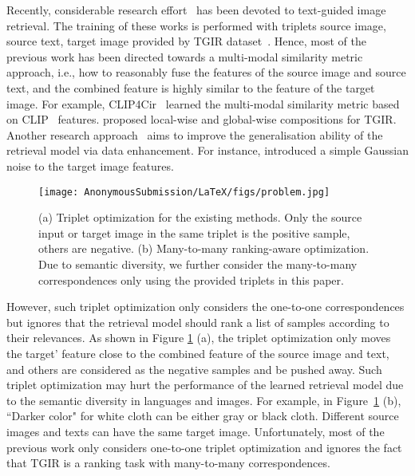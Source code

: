 \documentclass[letterpaper]{article} \usepackage{aaai24}  \usepackage{times}  \usepackage{helvet}  \usepackage{courier}  \usepackage[hyphens]{url}  \usepackage{graphicx} \urlstyle{rm} \def\UrlFont{\rm}  \usepackage{natbib}  \usepackage{caption} \frenchspacing  \setlength{\pdfpagewidth}{8.5in} \setlength{\pdfpageheight}{11in} \usepackage{amsmath,amsfonts}
\begin{document}
Recently, considerable research effort~\cite{TIRG, Chen_2020_CVPR, zhang2020joint, CLVC-Net, CLIP4Cir, chen2022composed} has been devoted to text-guided image retrieval.
The training of these works is performed with triplets source image, source text, target image provided by TGIR dataset~\cite{guo2019fashion, liu2021image}. Hence, most of the previous work has been directed towards a multi-modal similarity metric approach, i.e., how to reasonably fuse the features of the source image and source text, and the combined feature is highly similar to the feature of the target image. For example, CLIP4Cir~\cite{CLIP4Cir} learned the multi-modal similarity metric based on CLIP~\cite{Radford2021CLIP} features. \cite{CLVC-Net} proposed local-wise and global-wise compositions for TGIR. Another research approach~\cite{yan2020deep, Warburg2021iccv, chen2022composed} aims to improve the generalisation ability of the retrieval model via data enhancement. For instance, \cite{chen2022composed} introduced a simple Gaussian noise to the target image features. 


\begin{figure}
    \centering
    \texttt{[image: AnonymousSubmission/LaTeX/figs/problem.jpg]}
    \caption{(a) Triplet optimization for the existing methods. Only the source input or target image in the same triplet is the positive sample, others are negative. (b) Many-to-many ranking-aware optimization. Due to semantic diversity, we further consider the many-to-many correspondences only using the provided triplets in this paper.}
    \label{fig:problem}
\end{figure}
However, such triplet optimization only considers the one-to-one correspondences but ignores that the retrieval model should rank a list of samples according to their relevances. As shown in Figure \ref{fig:problem}  (a), the triplet optimization only moves the target' feature close to the combined feature of the source image and text, and others are considered as the negative samples and be pushed away. Such triplet optimization may hurt the performance of the learned retrieval model due to the semantic diversity in languages and images. For example, in Figure~\ref{fig:problem}  (b), ``Darker color" for  white cloth can be either gray or black cloth.  Different source images and texts can have the same target image. Unfortunately, most of the previous work only considers one-to-one triplet optimization and ignores the fact that TGIR is a ranking task with many-to-many correspondences. 
\end{document}
